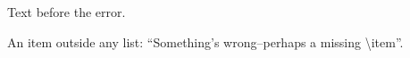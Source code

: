 \documentclass{article}
\begin{document}
Text before the error.
\item An item outside any list: ``Something's wrong--perhaps a missing
\textbackslash item''.
\end{document}

